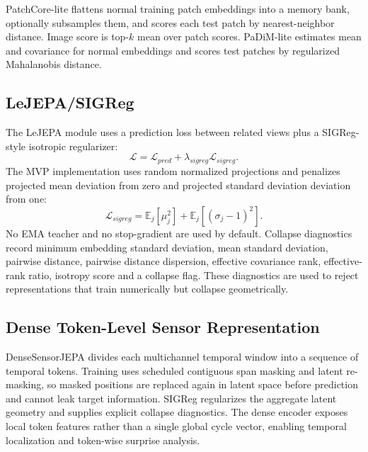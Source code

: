 \documentclass[10pt,conference]{IEEEtran}
\begin{document}
PatchCore-lite flattens normal training patch embeddings into a memory bank, optionally subsamples them, and scores each test patch by nearest-neighbor distance. Image score is top-$k$ mean over patch scores. PaDiM-lite estimates mean and covariance for normal embeddings and scores test patches by regularized Mahalanobis distance.

\subsection{LeJEPA/SIGReg}
The LeJEPA module uses a prediction loss between related views plus a SIGReg-style isotropic regularizer:
\begin{equation}
\mathcal{L} = \mathcal{L}_{pred} + \lambda_{sigreg}\mathcal{L}_{sigreg}.
\end{equation}
The MVP implementation uses random normalized projections and penalizes projected mean deviation from zero and projected standard deviation deviation from one:
\begin{equation}
\mathcal{L}_{sigreg} = \mathbb{E}_j[\mu_j^2] + \mathbb{E}_j[(\sigma_j - 1)^2].
\end{equation}
No EMA teacher and no stop-gradient are used by default. Collapse diagnostics record minimum embedding standard deviation, mean standard deviation, pairwise distance, pairwise distance dispersion, effective covariance rank, effective-rank ratio, isotropy score and a collapse flag. These diagnostics are used to reject representations that train numerically but collapse geometrically.

\subsection{Dense Token-Level Sensor Representation}
DenseSensorJEPA divides each multichannel temporal window into a sequence of temporal tokens. Training uses scheduled contiguous span masking and latent re-masking, so masked positions are replaced again in latent space before prediction and cannot leak target information. SIGReg regularizes the aggregate latent geometry and supplies explicit collapse diagnostics. The dense encoder exposes local token features rather than a single global cycle vector, enabling temporal localization and token-wise surprise analysis.
\end{document}
